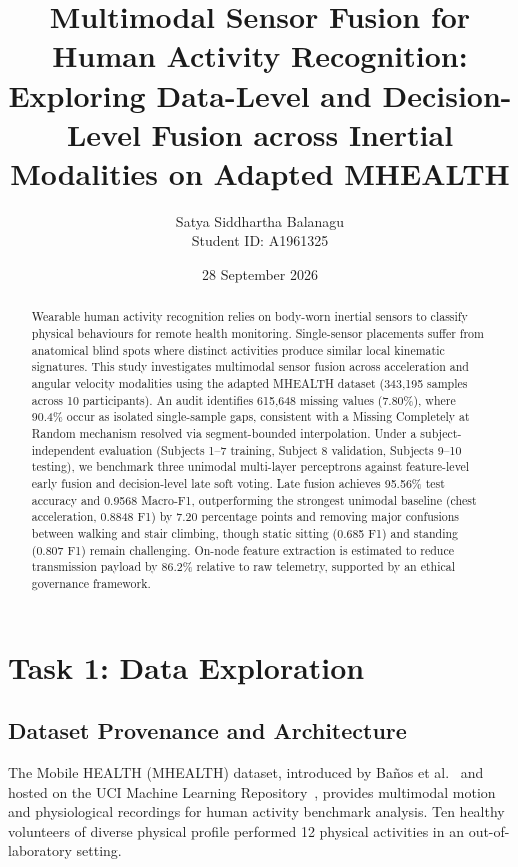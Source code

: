 \documentclass[10pt,twocolumn]{article}
\title{\textbf{Multimodal Sensor Fusion for Human Activity Recognition:}\\
\large Exploring Data-Level and Decision-Level Fusion across Inertial Modalities on Adapted MHEALTH}
\author{
Satya Siddhartha Balanagu\\
Student ID: A1961325\\
}
\date{28 September 2026}
\begin{document}
\maketitle

\begin{abstract}
Wearable human activity recognition relies on body-worn inertial sensors to classify physical behaviours for remote health monitoring. Single-sensor placements suffer from anatomical blind spots where distinct activities produce similar local kinematic signatures. This study investigates multimodal sensor fusion across acceleration and angular velocity modalities using the adapted MHEALTH dataset (343,195 samples across 10 participants). An audit identifies 615,648 missing values (7.80\%), where 90.4\% occur as isolated single-sample gaps, consistent with a Missing Completely at Random mechanism resolved via segment-bounded interpolation. Under a subject-independent evaluation (Subjects 1--7 training, Subject 8 validation, Subjects 9--10 testing), we benchmark three unimodal multi-layer perceptrons against feature-level early fusion and decision-level late soft voting. Late fusion achieves 95.56\% test accuracy and 0.9568 Macro-F1, outperforming the strongest unimodal baseline (chest acceleration, 0.8848 F1) by 7.20 percentage points and removing major confusions between walking and stair climbing, though static sitting (0.685 F1) and standing (0.807 F1) remain challenging. On-node feature extraction is estimated to reduce transmission payload by 86.2\% relative to raw telemetry, supported by an ethical governance framework.
\end{abstract}

\section{Task 1: Data Exploration}
\label{sec:task1}

\subsection{Dataset Provenance and Architecture}
The Mobile HEALTH (MHEALTH) dataset, introduced by Ba{\~n}os et al.~\cite{banos2014mhealthdroid,banos2015sensor} and hosted on the UCI Machine Learning Repository~\cite{mhealth_uci_2014}, provides multimodal motion and physiological recordings for human activity benchmark analysis. Ten healthy volunteers of diverse physical profile performed 12 physical activities in an out-of-laboratory setting.
\end{document}
